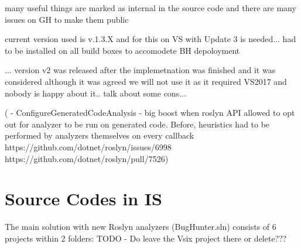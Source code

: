 \documentclass[
  digital, %
  table,   %
  lof,     %
  lot,     %
  oneside,
]{fithesis3}
\begin{document}
many useful things are marked as internal in the source code and there are many issues on GH to make them public

current version used is v.1.3.X and for this on VS with Update 3 is needed... had to be installed on all build boxes to accomodete BH depoloyment

... version v2 was released after the implemetnation was finished and it was considered although it was agreed we will not use it as it required VS2017 and nobody is happy about it.. talk about some cons...

(  - ConfigureGeneratedCodeAnalysis - big boost when roslyn API allowed to opt out for analyzer to be run on generated code. Before, heuristics had to be performed by analyzers themselves on every callback
   https://github.com/dotnet/roslyn/issues/6998
   https://github.com/dotnet/roslyn/pull/7526)



	\makeatletter\thesis@blocks@clear\makeatother

	\printindex
    
  \printbibliography

	\appendix %
  \chapter{Source Codes in IS}
  The main solution with new Roslyn analyzers (BugHunter.sln) consists of 6 projects within 2 folders: TODO - Do leave the Vsix project there or delete???
\end{document}
